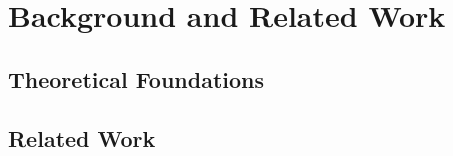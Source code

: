 \chapter{Background and Related Work}\label{background}

\section{Theoretical Foundations}


\section{Related Work}

